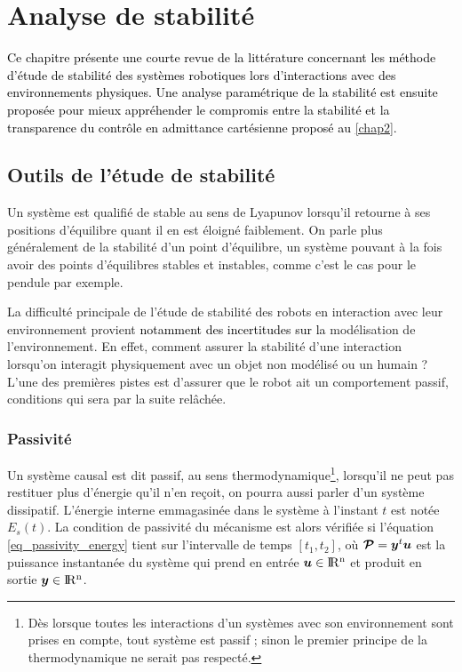 \chapter{Analyse de stabilité} \label{chap5}
\minitoc

\textcolor{black}{Ce chapitre présente une courte revue de la littérature concernant les méthode d'étude de stabilité des systèmes robotiques lors d'interactions avec des environnements physiques. Une analyse paramétrique de la stabilité est ensuite proposée pour mieux appréhender le compromis entre la stabilité et la transparence du contrôle en admittance cartésienne proposé au \cref{chap2}.}

\section{Outils de l'étude de stabilité} \label{chap5_sec_litterature}

Un système est qualifié de stable au sens de Lyapunov lorsqu'il retourne à ses positions d'équilibre quant il en est éloigné faiblement. On parle plus généralement de la stabilité d'un point d'équilibre, un système pouvant à la fois avoir des points d'équilibres stables et instables, comme c'est le cas pour le pendule par exemple.

La difficulté principale de l'étude de stabilité des robots en interaction avec leur environnement provient \textcolor{black}{notamment des incertitudes sur la} modélisation de l'environnement. En effet, comment assurer la stabilité d'une interaction lorsqu'on interagit physiquement avec un objet non modélisé ou un humain ? L'une des premières pistes est d'assurer que le robot ait un comportement passif, conditions qui sera par la suite relâchée.

\subsection{Passivité} \label{chap5_sec_litterature_sub_passivity}

Un système causal est dit passif, au sens thermodynamique\footnote{Dès lorsque toutes les interactions d'un systèmes avec son environnement sont prises en compte, tout système est passif ; sinon le premier principe de la thermodynamique ne serait pas respecté.}, lorsqu’il ne peut pas restituer plus d’énergie qu’il n'en reçoit, on pourra aussi parler d'un système dissipatif. L’énergie interne emmagasinée dans le système à l’instant $t$ est notée $E_s(t)$. La condition de passivité du mécanisme est alors vérifiée si l'équation \cref{eq_passivity_energy} tient sur l'intervalle de temps $[t_1,t_2]$, où $\matrCal{P} = \vect{y}^t \vect{u}$ est la puissance instantanée du système qui prend en entrée $\vect{u} \in \Re^n$ et produit en sortie $\vect{y} \in \Re^n$.

